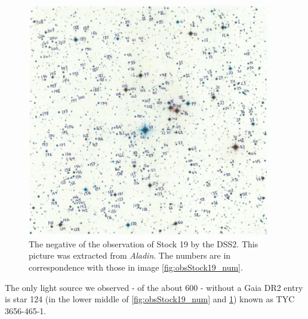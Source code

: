 \documentclass{article}
\begin{document}
\begin{figure}[H]
  \centering
    \includegraphics[width=0.95\textwidth]{DSS2Stock19_num.jpg}
  \caption{The negative of the observation of Stock 19 by the DSS2. This picture was extracted from \textit{Aladin}. The numbers are in correspondence with those in image \ref{fig:obsStock19_num}.}
  \label{fig:DSS2Stock19_num}
\end{figure}

The only light source we observed - of the about 600 - without a Gaia DR2 entry is star 124 (in the lower middle of \ref{fig:obsStock19_num} and \ref{fig:DSS2Stock19_num}) known as TYC 3656-465-1. 
\end{document}
